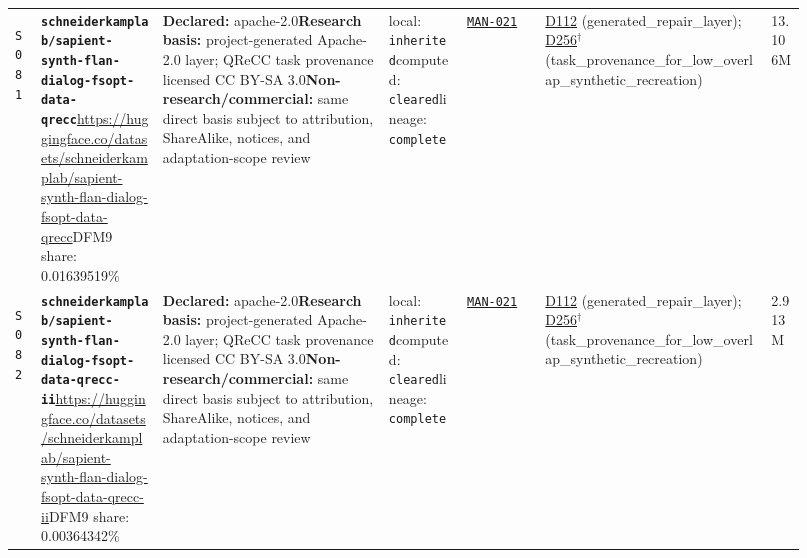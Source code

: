 \documentclass[9pt,a4paper]{article}
\newcommand{\srcid}[1]{\hypertarget{src:#1}{\texttt{#1}}}
\begin{document}
\begin{landscape}
\begin{longtable}{@{}L{0.03\linewidth}L{0.14\linewidth}L{0.26\linewidth}L{0.09\linewidth}L{0.09\linewidth}L{0.265\linewidth}L{0.045\linewidth}@{}}
\srcid{S081} & \textbf{\nolinkurl{schneiderkamplab/sapient-synth-flan-dialog-fsopt-data-qrecc}}\newline \url{https://huggingface.co/datasets/schneiderkamplab/sapient-synth-flan-dialog-fsopt-data-qrecc}\newline DFM9 share: 0.01639519\% & \textbf{Declared:} apache-2.0\newline \textbf{Research basis:} project-generated Apache-2.0 layer; QReCC task provenance licensed CC BY-SA 3.0\newline \textbf{Non-research/commercial:} same direct basis subject to attribution, ShareAlike, notices, and adaptation-scope review & local: \texttt{inherited}\newline computed: \texttt{cleared}\newline lineage: \texttt{complete} & \hyperlink{manual:MAN-021}{\texttt{MAN-021}} & \hyperlink{dep:D112}{D112} (generated\_repair\_layer); \hyperlink{dep:D256}{D256}$^{\dagger}$ (task\_provenance\_for\_low\_overlap\_synthetic\_recreation) & 13.106M \\
\srcid{S082} & \textbf{\nolinkurl{schneiderkamplab/sapient-synth-flan-dialog-fsopt-data-qrecc-ii}}\newline \url{https://huggingface.co/datasets/schneiderkamplab/sapient-synth-flan-dialog-fsopt-data-qrecc-ii}\newline DFM9 share: 0.00364342\% & \textbf{Declared:} apache-2.0\newline \textbf{Research basis:} project-generated Apache-2.0 layer; QReCC task provenance licensed CC BY-SA 3.0\newline \textbf{Non-research/commercial:} same direct basis subject to attribution, ShareAlike, notices, and adaptation-scope review & local: \texttt{inherited}\newline computed: \texttt{cleared}\newline lineage: \texttt{complete} & \hyperlink{manual:MAN-021}{\texttt{MAN-021}} & \hyperlink{dep:D112}{D112} (generated\_repair\_layer); \hyperlink{dep:D256}{D256}$^{\dagger}$ (task\_provenance\_for\_low\_overlap\_synthetic\_recreation) & 2.913M \\

\end{longtable}
\end{landscape}
\end{document}
